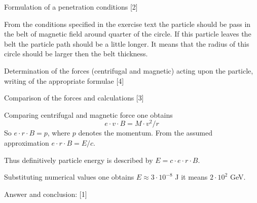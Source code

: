 Formulation of a penetration conditions \hfill[2]

From the conditions specified in the exercise text the particle should be pass in the belt of
magnetic field around quarter of the circle. If this particle leaves the belt the particle path
should be a little longer. It means that the radius of this circle should be larger then the belt
thickness.

Determination of the forces (centrifugal and magnetic) acting upon the particle, writing of the
appropriate formulae \hfill[4]

Comparison of the forces and calculations \hfill[3]

Comparing centrifugal and magnetic force one obtains
\[
e \cdot v \cdot B = M \cdot v^2 / r
\]
So $e \cdot r \cdot B = p$, where $p$ denotes the momentum. From the assumed approximation
$e \cdot r \cdot B = E / c$.

Thus definitively particle energy is described by $E = c \cdot e \cdot r \cdot B$.

Substituting numerical values one obtains $E \approx 3\cdot10^{-8}$ J it means
$2\cdot10^{2}$ GeV.

Answer and conclusion: \hfill[1]
